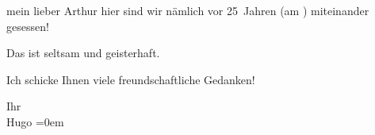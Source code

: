 \pstart{}mein lieber Arthur\pend\vspace{0.5em}
\pstart
           hier sind wir nämlich vor 25 Jahren (am \label{K_L02399-1v}\label{K_L02399-1}) miteinander gesessen!\pend
           
\pstart
           Das ist seltsam und geisterhaft.\pend
           
\pstart
           Ich schicke Ihnen viele freundschaftliche Gedanken!\pend
           
\pstart
           Ihr{\\[\baselineskip]}\spacefill\mbox{Hugo}\pend
           \leftskip=0em{}\endnumbering{}  \newcommand{\dateiname}{L02399}\newcommand{\titel}{Hugo Hofmannsthal an Arthur Schnitzler, 15. 5. 1923}\newcommand{\editorInnen}{Martin Anton Müller und Gerd-Hermann Susen}
